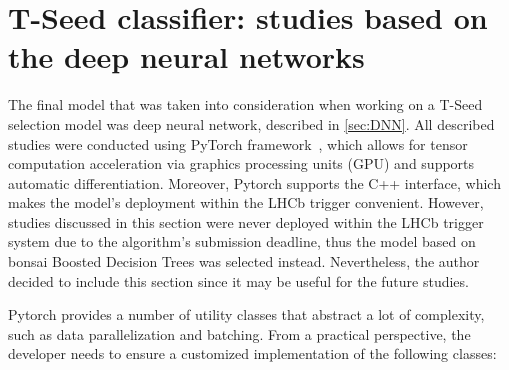 \section{T-Seed classifier: studies based on the deep neural networks}

The final model that was taken into consideration when working on a T-Seed selection model was deep neural network, described in \ref{sec:DNN}. 
All described studies were conducted using PyTorch framework~\cite{pytorch}, which allows for tensor computation acceleration via graphics processing units (GPU) and supports automatic differentiation. Moreover, Pytorch supports the C++ interface, which makes the model's deployment within the LHCb trigger convenient. 
However, studies discussed in this section were never deployed within the LHCb trigger system due to the algorithm's submission deadline, thus the model based on bonsai Boosted Decision Trees was selected instead.  Nevertheless, the author decided to include this section since it may be useful for the future studies. 
 
Pytorch provides a number of utility classes that abstract a lot of complexity, such as data parallelization and batching. From a practical perspective, the developer needs to ensure a customized implementation of the following classes: 

